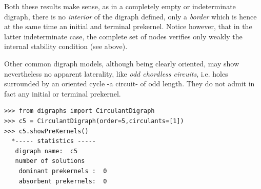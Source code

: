 Both these results make sense, as in a completely empty or indeterminate digraph, there is no \emph{interior} of the digraph defined, only a \emph{border} which is hence at the same time an initial and terminal prekernel.  Notice however, that in the latter indeterminate case, the complete set of nodes verifies only weakly the internal stability condition (see above).

Other common digraph models, although being clearly oriented, may show nevertheless no apparent laterality, like \emph{odd chordless circuits}, i.e. holes surrounded by an oriented cycle -a circuit- of odd length. They do not admit in fact any initial or terminal prekernel.
\begin{lstlisting}
>>> from digraphs import CirculantDigraph
>>> c5 = CirculantDigraph(order=5,circulants=[1])
>>> c5.showPreKernels()
  *----- statistics -----
   digraph name:  c5
   number of solutions
    dominant prekernels :  0
    absorbent prekernels:  0
\end{lstlisting}

